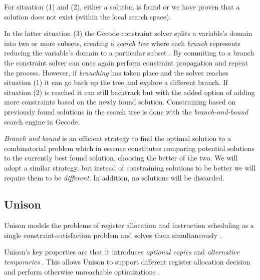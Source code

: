For situation (1) and (2), either a solution is found or we have proven that a solution
does not exist (within the local search space).

In the latter situation (3) the Gecode constraint solver splits a variable's domain into
two or more subsets, creating a \textit{search tree} where each \textit{branch} represents
reducing the variable's domain to a particular subset \cite[Section~8]{MPG}. By commiting
to a branch the constraint solver can once again perform constraint propagation and repeat
the process. However, if \textit{branching} has taken place and the solver reaches
situation (1) it can go back up the tree and explore a different branch. If situation (2)
is reached it can still backtrack but with the added option of adding more constraints
based on the newly found solution. Constraining based on previously found solutions in the
search tree is done with the \textit{branch-and-bound} search engine\cite[Section~9]{MPG}
in Gecode.

\textit{Branch and bound} is an efficient strategy to find the optimal solution to a
combinatorial problem which in essence constitutes comparing potential solutions to the
currently best found solution, choosing the better of the two\cite{BaB}. We will adopt a
similar strategy, but instead of constraining solutions to be better we will require them
to be \textit{different}. In addition, no solutions will be discarded.

\subsection{Unison}


Unison models the problems of register allocation and instruction scheduling as a single
constraint-satisfaction problem and solves them simultaneously \cite{unison-docs,reg-alloc-inst-sched-uni}.

Unison's key properties are that it introduces \textit{optional copies} and
\textit{alternative temporaries} \cite{reg-alloc-inst-sched-uni}. This allows Unison to
support different register allocation decision and perform otherwise unreachable optimizations
\cite{reg-alloc-inst-sched-uni, comb-spill}.
